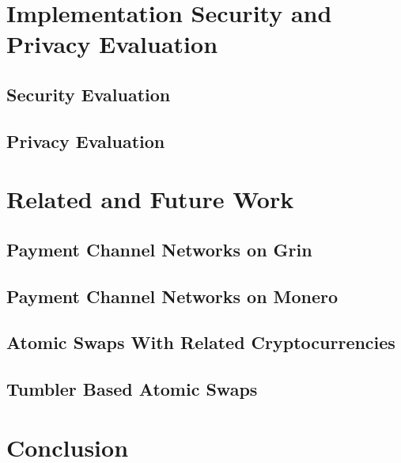 \documentclass[draft,final]{vutinfth} %
\begin{document}
\chapter{Implementation Security and Privacy Evaluation}
\section{Security Evaluation}
\section{Privacy Evaluation}

\chapter{Related and Future Work}
\section{Payment Channel Networks on Grin}
\section{Payment Channel Networks on Monero}
\section{Atomic Swaps With Related Cryptocurrencies}
\section{Tumbler Based Atomic Swaps}

\chapter{Conclusion}



\backmatter

\listoffigures %

\cleardoublepage %
\listoftables %

\listofalgorithms
{}

\printindex

\printglossaries



\end{document}
